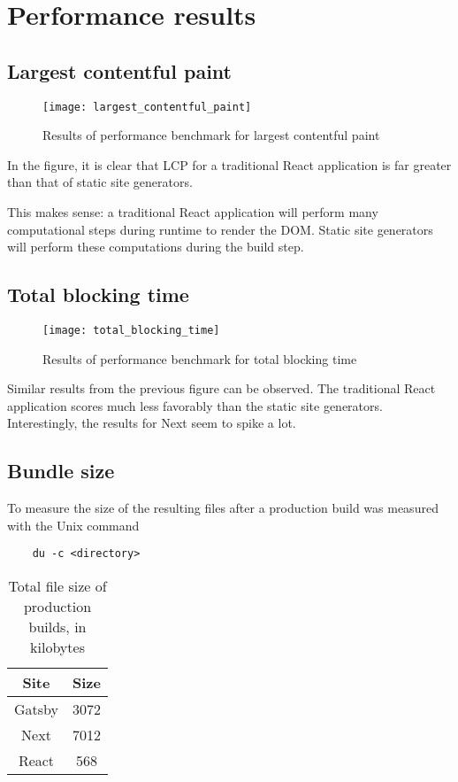 \chapter{Performance results} %

\label{Chapter4} 

\section{Largest contentful paint}

\begin{figure}[h!]
	\texttt{[image: largest\_contentful\_paint]}
	\caption{Results of performance benchmark for largest contentful paint}
	\label{fig:largest_contentful_paint}
\end{figure}

In the figure, it is clear that LCP for a traditional React application is far greater than that of static site generators.

This makes sense: a traditional React application will perform many computational steps during runtime to render the DOM.
Static site generators will perform these computations during the build step.

\section{Total blocking time}


\begin{figure}[h!]
	\texttt{[image: total\_blocking\_time]}
	\caption{Results of performance benchmark for total blocking time}
	\label{fig:total_blocking_time}
\end{figure}

Similar results from the previous figure can be observed. 
The traditional React application scores much less favorably than the static site generators.
Interestingly, the results for Next seem to spike a lot.

\section{Bundle size}

To measure the size of the resulting files after a production build was measured with the Unix command 

\begin{verbatim}
	du -c <directory>
\end{verbatim}

\begin{table}[h!]
	\begin{center}
		\begin{tabular}{||c c||} 
			\hline
			Site   & Size \\ [0.5ex] 
			\hline\hline
			Gatsby & 3072 \\ 
			\hline
			Next   & 7012 \\
			\hline
			React  & 568  \\[1ex] 
			\hline
		\end{tabular}
		\caption{Total file size of production builds, in kilobytes }
	\end{center}
\end{table}

